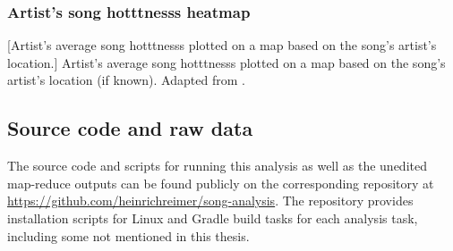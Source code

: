 \documentclass[                                                             %
        12pt,                                                                   %
        twoside                                                                 %
    ]{scrartcl}                                                                 %
\begin{document}
\subsubsection{Artist's song hotttnesss heatmap}

\begin{minipage}{\linewidth}
    \centering
    [Artist's average song hotttnesss plotted on a map based on the song's artist's location.]{%
        Artist's average song hotttnesss plotted on a map based on the song's artist's location (if known).
        Adapted from \textcite{gaba2008tissot}.
    }
    \label{fig:average-song-hotttnesss-by-artist-b}
\end{minipage}

\subsection{Source code and raw data}

The source code and scripts for running 
this analysis as well as the unedited 
map-reduce outputs can be found publicly 
on the corresponding repository at 
\url{https://github.com/heinrichreimer/song-analysis}.
The repository provides installation scripts for Linux
and Gradle build tasks for each analysis task,
including some not mentioned in this thesis. 

\end{document}

